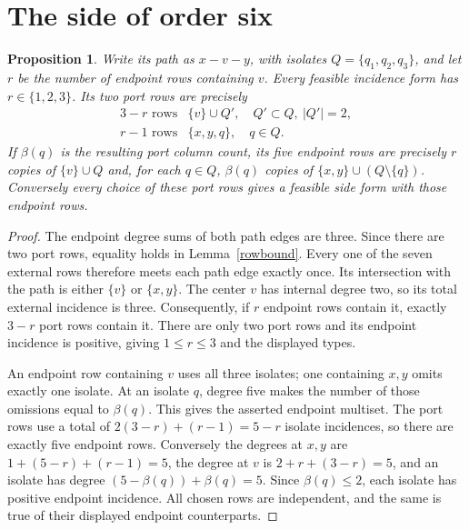 \documentclass[11pt]{article}
\newtheorem{proposition}[theorem]{Proposition}
\begin{document}
\section*{The side of order six}

\begin{proposition}\label{sixforms}
Write its path as $x-v-y$, with isolates $Q=\{q_1,q_2,q_3\}$, and
let $r$ be the number of endpoint rows containing $v$. Every feasible
incidence form has $r\in\{1,2,3\}$. Its two port rows are precisely
\[
 \begin{array}{ll}
 3-r\text{ rows}&\{v\}\cup Q',\quad Q'\subset Q,\ |Q'|=2,\\
 r-1\text{ rows}&\{x,y,q\},\quad q\in Q.
 \end{array}
\]
If $\beta(q)$ is the resulting port column count, its five endpoint
rows are precisely $r$ copies of $\{v\}\cup Q$ and, for each $q\in Q$,
$\beta(q)$ copies of $\{x,y\}\cup(Q\setminus\{q\})$.
Conversely every choice of these port rows gives a feasible side form
with those endpoint rows.
\end{proposition}
\begin{proof}
The endpoint degree sums of both path edges are three. Since there are
two port rows, equality holds in Lemma~\ref{rowbound}. Every one of the
seven external rows therefore meets each path edge exactly once. Its
intersection with the path is either $\{v\}$ or $\{x,y\}$.
The center $v$ has internal degree two, so its total external incidence
is three. Consequently, if $r$ endpoint rows contain it, exactly $3-r$
port rows contain it. There are only two port rows and its endpoint
incidence is positive, giving $1\leq r\leq3$ and the displayed types.

An endpoint row containing $v$ uses all three isolates; one containing
$x,y$ omits exactly one isolate. At an isolate $q$, degree five makes
the number of those omissions equal to $\beta(q)$. This gives the
asserted endpoint multiset. The port rows use a total of
$2(3-r)+(r-1)=5-r$ isolate incidences, so there are exactly five endpoint
rows. Conversely the degrees at $x,y$ are
$1+(5-r)+(r-1)=5$, the degree at $v$ is $2+r+(3-r)=5$, and an isolate
has degree $(5-\beta(q))+\beta(q)=5$. Since $\beta(q)\leq2$, each
isolate has positive endpoint incidence. All chosen rows are independent,
and the same is true of their displayed endpoint counterparts.
\end{proof}
\end{document}
